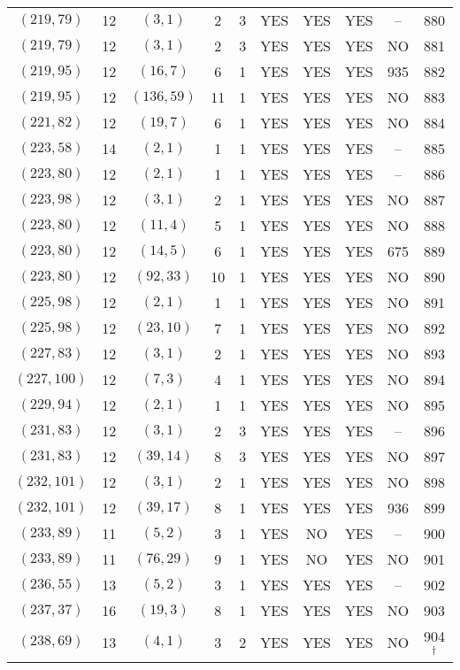 \begin{longtable}{|c|c|c|c|c|c|c|c|c|c|}
$(219, 79)$ & 12 & $(3, 1)$ & 2 & 3 & YES & YES & YES & -- & 880\\
$(219, 79)$ & 12 & $(3, 1)$ & 2 & 3 & YES & YES & YES & NO & 881\\
$(219, 95)$ & 12 & $(16, 7)$ & 6 & 1 & YES & YES & YES & 935 & 882\\
$(219, 95)$ & 12 & $(136, 59)$ & 11 & 1 & YES & YES & YES & NO & 883\\
$(221, 82)$ & 12 & $(19, 7)$ & 6 & 1 & YES & YES & YES & NO & 884\\
$(223, 58)$ & 14 & $(2, 1)$ & 1 & 1 & YES & YES & YES & -- & 885\\
$(223, 80)$ & 12 & $(2, 1)$ & 1 & 1 & YES & YES & YES & -- & 886\\
$(223, 98)$ & 12 & $(3, 1)$ & 2 & 1 & YES & YES & YES & NO & 887\\
$(223, 80)$ & 12 & $(11, 4)$ & 5 & 1 & YES & YES & YES & NO & 888\\
$(223, 80)$ & 12 & $(14, 5)$ & 6 & 1 & YES & YES & YES & 675 & 889\\
$(223, 80)$ & 12 & $(92, 33)$ & 10 & 1 & YES & YES & YES & NO & 890\\
$(225, 98)$ & 12 & $(2, 1)$ & 1 & 1 & YES & YES & YES & NO & 891\\
$(225, 98)$ & 12 & $(23, 10)$ & 7 & 1 & YES & YES & YES & NO & 892\\
$(227, 83)$ & 12 & $(3, 1)$ & 2 & 1 & YES & YES & YES & NO & 893\\
$(227, 100)$ & 12 & $(7, 3)$ & 4 & 1 & YES & YES & YES & NO & 894\\
$(229, 94)$ & 12 & $(2, 1)$ & 1 & 1 & YES & YES & YES & NO & 895\\
$(231, 83)$ & 12 & $(3, 1)$ & 2 & 3 & YES & YES & YES & -- & 896\\
$(231, 83)$ & 12 & $(39, 14)$ & 8 & 3 & YES & YES & YES & NO & 897\\
$(232, 101)$ & 12 & $(3, 1)$ & 2 & 1 & YES & YES & YES & NO & 898\\
$(232, 101)$ & 12 & $(39, 17)$ & 8 & 1 & YES & YES & YES & 936 & 899\\
$(233, 89)$ & 11 & $(5, 2)$ & 3 & 1 & YES & NO & YES & -- & 900\\
$(233, 89)$ & 11 & $(76, 29)$ & 9 & 1 & YES & NO & YES & NO & 901\\
$(236, 55)$ & 13 & $(5, 2)$ & 3 & 1 & YES & YES & YES & -- & 902\\
$(237, 37)$ & 16 & $(19, 3)$ & 8 & 1 & YES & YES & YES & NO & 903\\
$(238, 69)$ & 13 & $(4, 1)$ & 3 & 2 & YES & YES & YES & NO & 904 ${}^\dagger$\\

\end{longtable}
